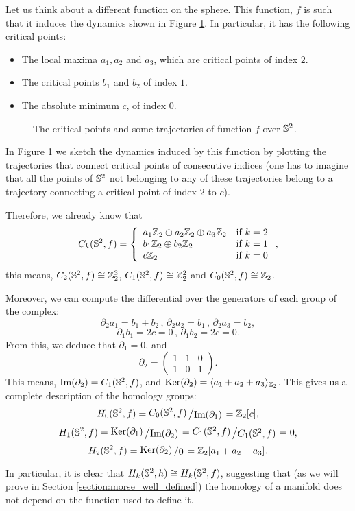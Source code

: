 \begin{exmpl} Let us think about a different function on the sphere. This function, $f$ is such that it induces the dynamics shown in Figure \ref{figure:example2}. In particular, it has the following critical points:
\begin{itemize}
	\item The local maxima $a_1,a_2$ and $a_3$, which are critical points of index $2$.
	\item The critical points $b_1$ and $b_2$ of index $1$.
	\item The absolute minimum $c$, of index $0$.
\end{itemize}

\begin{figure}[h]
	\centering
	
	\caption{The critical points and some trajectories of function $f$ over $\mathbb{S}^2$.}
	\label{figure:example2}
\end{figure}

In Figure \ref{figure:example2} we sketch the dynamics induced by this function by plotting the trajectories that connect critical points of consecutive indices (one has to imagine that all the points of $\mathbb{S}^2$ not belonging to any of these trajectories belong to a trajectory connecting a critical point of index $2$ to $c$).

Therefore, we already know that
\[C_k(\mathbb{S}^2,f) = \left\{ \begin{array}{lc} a_1\mathbb{Z}_2 \oplus a_2\mathbb{Z}_2 \oplus a_3\mathbb{Z}_2 & \text{if } k=2 \\ b_1\mathbb{Z}_2 \oplus b_2\mathbb{Z}_2 & \text{if } k=1 \\ c\mathbb{Z}_2 & \text{if } k=0 \end{array} \right. ,\]
this means, $C_2(\mathbb{S}^2,f) \cong \mathbb{Z}_2^3$, $C_1(\mathbb{S}^2,f) \cong \mathbb{Z}_2^2$ and $C_0(\mathbb{S}^2,f) \cong \mathbb{Z}_2$.

Moreover, we can compute the differential over the generators of each group of the complex:
\[\partial_2 a_1 = b_1+b_2 \, , \, \partial_2 a_2 = b_1 \, , \, \partial_2 a_3 = b_2,\]
\[\partial_1 b_1 = 2c = 0 \, , \, \partial_1 b_2 = 2c = 0 .\]
From this, we deduce that $\partial_1 = 0$, and
\[\partial_2 = \begin{pmatrix} 1 & 1 & 0 \\ 1 & 0 & 1 \end{pmatrix} .\]
This means, $\text{Im}(\partial_2) = C_1(\mathbb{S}^2,f)$, and $\text{Ker}(\partial_2) = \langle a_1+a_2+a_3 \rangle_{\mathbb{Z}_2}$. This gives us a complete description of the homology groups:
\[H_0(\con{S}^2,f) = \quocient{C_0(\con{S}^2,f)}{\text{Im}(\partial_1)} = \con{Z}_2[c] ,\]
\[H_1(\con{S}^2,f) = \quocient{\text{Ker}(\partial_1)}{\text{Im}(\partial_2)} = \quocient{C_1(\con{S}^2,f)}{C_1(\con{S}^2,f)} = 0,\]
\[H_2(\con{S}^2,f) = \quocient{\text{Ker}(\partial_2)}{0} = \con{Z}_2 [a_1+a_2+a_3] .\]

In particular, it is clear that $H_k(\mathbb{S}^2,h) \cong H_k(\mathbb{S}^2,f)$, suggesting that (as we will prove in Section \ref{section:morse_well_defined}) the homology of a manifold does not depend on the function used to define it.
\end{exmpl}

